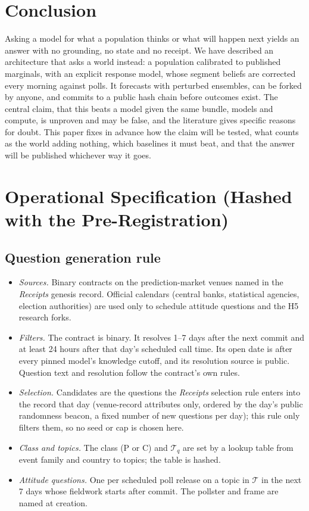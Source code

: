 \documentclass[11pt]{article}
\begin{document}
\section{Conclusion}

Asking a model for what a population thinks or what will happen next yields an answer with no grounding, no state and no receipt. We have described an architecture that asks a world instead: a population calibrated to published marginals, with an explicit response model, whose segment beliefs are corrected every morning against polls. It forecasts with perturbed ensembles, can be forked by anyone, and commits to a public hash chain before outcomes exist. The central claim, that this beats a model given the same bundle, models and compute, is unproven and may be false, and the literature gives specific reasons for doubt. This paper fixes in advance how the claim will be tested, what counts as the world adding nothing, which baselines it must beat, and that the answer will be published whichever way it goes.

\appendix
\section{Operational Specification (Hashed with the Pre-Registration)}\label{app:spec}

\subsection{Question generation rule}\label{app:qrule}
\begin{itemize}
  \item \emph{Sources.} Binary contracts on the prediction-market venues named in the \emph{Receipts} genesis record. Official calendars (central banks, statistical agencies, election authorities) are used only to schedule attitude questions and the H5 research forks.
  \item \emph{Filters.} The contract is binary. It resolves 1--7 days after the next commit and at least 24 hours after that day's scheduled call time. Its open date is after every pinned model's knowledge cutoff, and its resolution source is public. Question text and resolution follow the contract's own rules.
  \item \emph{Selection.} Candidates are the questions the \emph{Receipts} selection rule enters into the record that day (venue-record attributes only, ordered by the day's public randomness beacon, a fixed number of new questions per day); this rule only filters them, so no seed or cap is chosen here.
  \item \emph{Class and topics.} The class (P or C) and $\mathcal{T}_q$ are set by a lookup table from event family and country to topics; the table is hashed.
  \item \emph{Attitude questions.} One per scheduled poll release on a topic in $\mathcal{T}$ in the next 7 days whose fieldwork starts after commit. The pollster and frame are named at creation.
\end{itemize}
\end{document}
